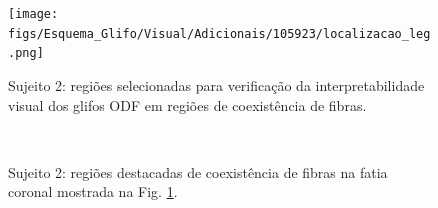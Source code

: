 \begin{figure}[H]
     \centering
     \texttt{[image: figs/Esquema\_Glifo/Visual/Adicionais/105923/localizacao\_leg.png]}
      \caption{Sujeito 2: regiões selecionadas para verificação da interpretabilidade visual dos glifos ODF em regiões de coexistência de fibras.}
       \label{fig::105923_localizacao}
 \end{figure}

\begin{figure}[H]
 \centering
    \\
    \label{fig::105923_fanning}
    \caption{Sujeito 2: regiões destacadas de coexistência de fibras na fatia coronal mostrada na Fig. \ref{fig::105923_localizacao}.
    }
    \label{fig::105923}
\end{figure}

